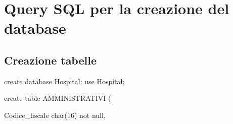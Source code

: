 \documentclass[a4paper,12pt]{report}
\begin{document}
\begin{figure}[p]
\end{figure}

\appendix 
\chapter{Query SQL per la creazione del database}
\section{Creazione tabelle}

create database Hospital;\newline
use Hospital;\newline

\noindent create table AMMINISTRATIVI (

     Codice\_fiscale char(16) not null,
\end{document}
